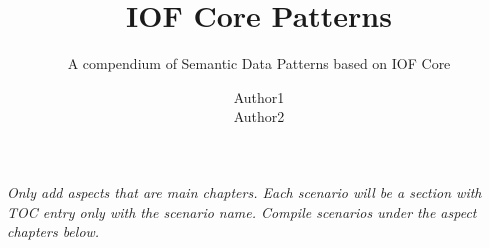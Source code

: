 \documentclass{tudelft-report}
\begin{document}
\frontmatter

\title{IOF Core Patterns}
\subtitle{A compendium of Semantic Data Patterns based on IOF Core}
\author{Author1 \\ Author2}

\subject{Draft} %






\tableofcontents




\mainmatter




\textit{
Only add aspects that are main chapters. Each scenario will be a section with TOC entry only with the scenario name. Compile scenarios under the aspect chapters below.
}
















\setcounter{biburlnumpenalty}{7000}
\setcounter{biburllcpenalty}{7000}
\setcounter{biburlucpenalty}{7000}

\printbibliography[heading=bibintoc,title=References]


\appendix




\end{document}
